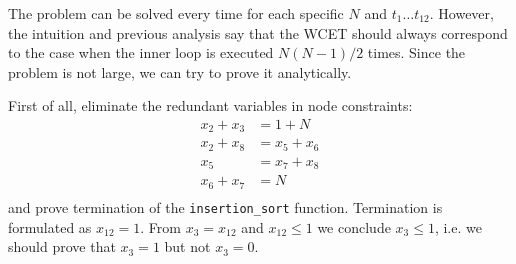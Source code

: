 \documentclass[12pt,a4paper,titlepage,oneside]{article}
\begin{document}
\begin{itemize}
The problem can be solved every time for each specific $N$ and $t_{1} \ldots t_{12}$.
However, the intuition and previous analysis say that the WCET should always correspond to the case when the inner loop is executed $N(N-1)/2$ times.
Since the problem is not large, we can try to prove it analytically.

First of all, eliminate the redundant variables in node constraints:
\begin{equation}
	\left.\begin{aligned}
		x_2 + x_3	&= 1 + N\\
		x_2 + x_8	&= x_5 + x_6\\
		x_5			&= x_7 + x_8\\
		x_6 + x_7	&= N\\
	\end{aligned}\right.
\label{equ:node_simpl}
\end{equation}
and prove termination of the \texttt{insertion\_sort} function.
Termination is formulated as $x_{12} = 1$.
From $x_3 = x_{12}$ and $x_{12} \leq 1$ we conclude $x_3 \leq 1$, i.e. we should prove that $x_3 = 1$ but not $x_3 = 0$.


\end{itemize}
\end{document}
